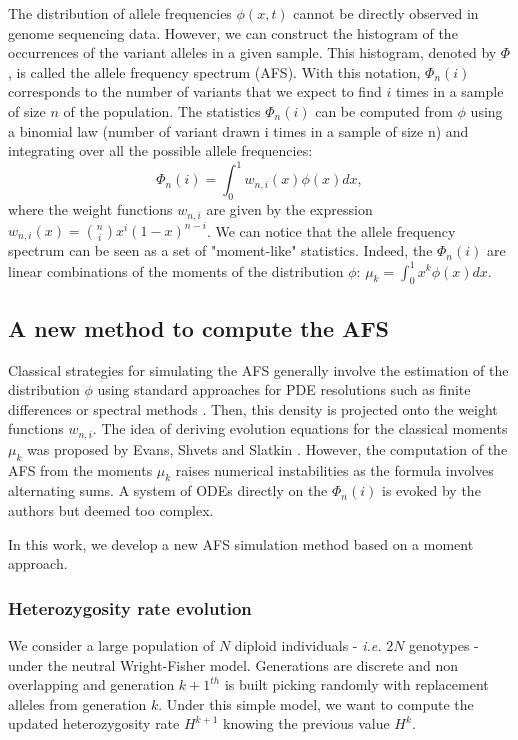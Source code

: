 The distribution of allele frequencies $\phi(x,t)$ cannot be directly observed in genome sequencing data. However, we can construct the histogram of the occurrences of the variant alleles in a given sample. This histogram, denoted by $\Phi$, is called the allele frequency spectrum (AFS). With this notation, $\Phi_n(i)$ corresponds to the number of variants that we expect to find $i$ times in a sample of size $n$ of the population. The statistics $\Phi_n(i)$ can be computed from $\phi$ using a binomial law (number of variant drawn i times in a sample of size n) and integrating over all the possible allele frequencies: 
$$
	 \Phi_n(i) = \int_0^1 w_{n,i}(x) \phi(x) dx,
$$
where the weight functions $w_{n,i}$ are given by the expression $w_{n,i}(x) = {n\choose i}  x^i (1-x)^{n-i}$.
We can notice that the allele frequency spectrum can be seen as a set of "moment-like" statistics. Indeed, the $\Phi_n(i)$ are linear combinations of the moments of the distribution $\phi$: $\mu_k = \int_0^1 x^k \phi(x)dx$.

\subsection{A new method to compute the AFS}
 Classical strategies for simulating the AFS generally involve the estimation of the distribution $\phi$ using standard approaches for PDE resolutions such as finite differences \cite{gutenkunst2009} or spectral methods \cite{lukic2011}. Then, this density is projected onto the weight functions $w_{n,i}$.
The idea of deriving evolution equations for the classical moments $\mu_k$ was proposed by Evans, Shvets and Slatkin \cite{evans2007}. However, the computation of the AFS from the moments $\mu_k$ raises numerical instabilities as the formula involves alternating sums. A system of ODEs directly on the $\Phi_n(i)$ is evoked by the authors but deemed too complex.

In this work, we develop a new AFS simulation method based on a moment approach.

\subsubsection{Heterozygosity rate evolution}
We consider a large population of $N$ diploid individuals - \textit{i.e.} $2N$ genotypes - under the neutral Wright-Fisher model. Generations are discrete and non overlapping and  generation $k+1^{th}$ is built picking randomly with replacement alleles from generation $k$. Under this simple model, we want to compute the updated heterozygosity rate $H^{k+1}$ knowing the previous value $H^k$.

